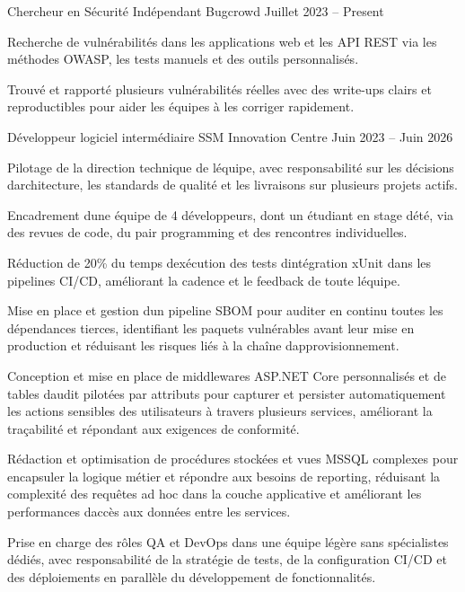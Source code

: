 \documentclass[]{resume-format}
\begin{document}

\begin{cventries}
    \cventry
    { Chercheur en Sécurité Indépendant }
    { Bugcrowd }
    {}
    { Juillet 2023 -- Present }
    {\begin{cvitems}
        \item { Recherche de vulnérabilités dans les applications web et les API REST via les méthodes OWASP, les tests manuels et des outils personnalisés. }
        \item { Trouvé et rapporté plusieurs vulnérabilités réelles avec des write-ups clairs et reproductibles pour aider les équipes à les corriger rapidement. }
    \end{cvitems}}

    \cventry
    { Développeur logiciel intermédiaire }
    { SSM Innovation Centre }
    {}
    { Juin 2023 -- Juin 2026 }
    {\begin{cvitems}
        \item { Pilotage de la direction technique de l\textquotesingle{}équipe, avec responsabilité sur les décisions d\textquotesingle{}architecture, les standards de qualité et les livraisons sur plusieurs projets actifs. }
        \item { Encadrement d\textquotesingle{}une équipe de 4 développeurs, dont un étudiant en stage d\textquotesingle{}été, via des revues de code, du pair programming et des rencontres individuelles. }
        \item { Réduction de 20\% du temps d\textquotesingle{}exécution des tests d\textquotesingle{}intégration xUnit dans les pipelines CI/CD, améliorant la cadence et le feedback de toute l\textquotesingle{}équipe. }
        \item { Mise en place et gestion d\textquotesingle{}un pipeline SBOM pour auditer en continu toutes les dépendances tierces, identifiant les paquets vulnérables avant leur mise en production et réduisant les risques liés à la chaîne d\textquotesingle{}approvisionnement. }
        \item { Conception et mise en place de middlewares ASP.NET Core personnalisés et de tables d\textquotesingle{}audit pilotées par attributs pour capturer et persister automatiquement les actions sensibles des utilisateurs à travers plusieurs services, améliorant la traçabilité et répondant aux exigences de conformité. }
        \item { Rédaction et optimisation de procédures stockées et vues MSSQL complexes pour encapsuler la logique métier et répondre aux besoins de reporting, réduisant la complexité des requêtes ad hoc dans la couche applicative et améliorant les performances d\textquotesingle{}accès aux données entre les services. }
        \item { Prise en charge des rôles QA et DevOps dans une équipe légère sans spécialistes dédiés, avec responsabilité de la stratégie de tests, de la configuration CI/CD et des déploiements en parallèle du développement de fonctionnalités. }
    \end{cvitems}}


\end{cventries}
\end{document}
